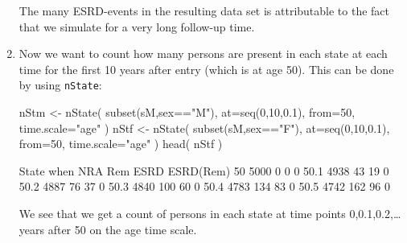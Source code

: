 \begin{enumerate}[resume]
\begin{Schunk}
\end{Schunk}
The many ESRD-events in the resulting data set is attributable to the
fact that we simulate for a very long follow-up time.


\item Now we want to count how many persons are present in each state
  at each time for the first 10 years after entry (which is at age 50). This
  can be done by using \texttt{nState}:
\begin{Schunk}
\begin{Sinput}
 nStm <- nState( subset(sM,sex=="M"), at=seq(0,10,0.1), from=50, time.scale="age" )
 nStf <- nState( subset(sM,sex=="F"), at=seq(0,10,0.1), from=50, time.scale="age" )
 head( nStf )
\end{Sinput}
\begin{Soutput}
      State
when    NRA  Rem ESRD ESRD(Rem)
  50   5000    0    0         0
  50.1 4938   43   19         0
  50.2 4887   76   37         0
  50.3 4840  100   60         0
  50.4 4783  134   83         0
  50.5 4742  162   96         0
\end{Soutput}
\end{Schunk}
  We see that we get a count of persons in each state at time points
  0,0.1,0.2,\ldots years after 50 on the age time scale.


\end{enumerate}
